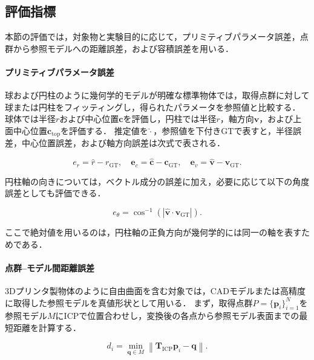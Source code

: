 \subsection{評価指標}
\label{sec:system:pointcloud:evaluation:metrics}

本節の評価では，対象物と実験目的に応じて，プリミティブパラメータ誤差，点群から参照モデルへの距離誤差，および容積誤差を用いる．

\paragraph{プリミティブパラメータ誤差}

球および円柱のように幾何学的モデルが明確な標準物体では，取得点群に対して球または円柱をフィッティングし，得られたパラメータを参照値と比較する．
球体では半径$r$および中心位置$\bm{c}$を評価し，円柱では半径$r$，軸方向$\bm{v}$，および上面中心位置$\bm{c}_{\mathrm{top}}$を評価する．
推定値を$\hat{\cdot}$，参照値を下付き$\mathrm{GT}$で表すと，半径誤差，中心位置誤差，および軸方向誤差は次式で表される．

\begin{equation}
  e_r = \hat{r}-r_{\mathrm{GT}}, \quad
  \bm{e}_{c} = \hat{\bm{c}}-\bm{c}_{\mathrm{GT}}, \quad
  \bm{e}_{v} = \hat{\bm{v}}-\bm{v}_{\mathrm{GT}}.
  \label{eq:system:primitive_error}
\end{equation}

円柱軸の向きについては，ベクトル成分の誤差に加え，必要に応じて以下の角度誤差としても評価できる．

\begin{equation}
  e_{\theta}=\cos^{-1}\left(\left|\hat{\bm{v}}\cdot\bm{v}_{\mathrm{GT}}\right|\right).
  \label{eq:system:axis_angle_error}
\end{equation}

ここで絶対値を用いるのは，円柱軸の正負方向が幾何学的には同一の軸を表すためである．

\paragraph{点群--モデル間距離誤差}

3Dプリンタ製物体のように自由曲面を含む対象では，CADモデルまたは高精度に取得した参照モデルを真値形状として用いる．
まず，取得点群$P=\{\bm{p}_i\}_{i=1}^{N}$を参照モデル$M$にICPで位置合わせし，変換後の各点から参照モデル表面までの最短距離を計算する．

\begin{equation}
  d_i=\min_{\bm{q}\in M}\left\|\bm{T}_{\mathrm{ICP}}\bm{p}_i-\bm{q}\right\|.
  \label{eq:system:point_to_model_distance}
\end{equation}

